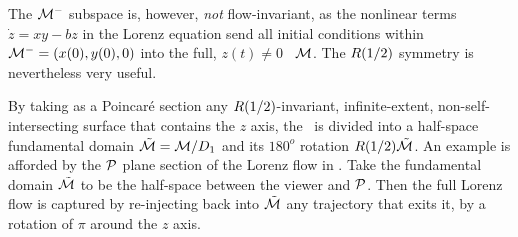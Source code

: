 {The ${\cal M}^-$ subspace is, however, {\em not} flow-invariant, as the nonlinear
terms $\dot{z}=xy - bz$ in the Lorenz equation 
send all initial conditions within
${\cal M}^-=(x(0),y(0),0)$ into the full, $z(t) \neq 0$ \statesp\  ${\cal M}$.
The $R(1/2)$ symmetry is nevertheless very useful.

By taking as a Poincar\'e section %
any  $R(1/2)$-invariant, infinite-extent, non-self-inter\-sect\-ing
surface that contains the
$z$ axis, the \statesp\ is divided into a half-space fundamental
domain $\tilde{{\cal M}}={\cal M}/D_1$ and its $180^o$ rotation $R(1/2)\tilde{{\cal M}}$.
An example is afforded by the ${\cal P}$ plane section of
the Lorenz flow in . Take
the  fundamental domain $\tilde{{\cal M}}$ to be the half-space between the
viewer and ${\cal P}$. Then the full Lorenz
flow is captured by re-injecting back into $\tilde{{\cal M}}$
any trajectory that exits it, by a rotation of $\pi$ around the $z$ axis.


}

